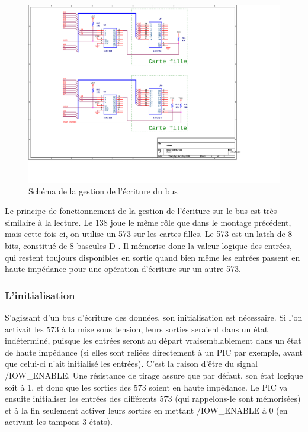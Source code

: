 \documentclass[a4paper]{article}
\begin{document}
\begin{figure}[H]
	\centering
	\includegraphics[scale=1.00]{Images/Montage_bus_ecriture}
	\caption{Schéma de la gestion de l'écriture du bus
		\label{Montage_bus_ecriture}}
\end{figure}

Le principe de fonctionnement de la gestion de l'écriture sur le bus est très similaire à la lecture. Le 138 \cite{74HC138} joue le même rôle que dans le montage précédent, mais cette fois ci, on utilise un 573 sur les cartes filles. Le 573 est un latch de 8 bits, constitué de 8 bascules D \cite{74HC573}. Il mémorise donc la valeur logique des entrées, qui restent toujours disponibles en sortie quand bien même les entrées passent en haute impédance pour une opération d'écriture sur un autre 573.

\subsubsection{L'initialisation}

S'agissant d'un bus d'écriture des données, son initialisation est nécessaire. Si l'on activait les 573 à la mise sous tension, leurs sorties seraient dans un état indéterminé, puisque les entrées seront au départ vraisemblablement dans un état de haute impédance (si elles sont reliées directement à un PIC par exemple, avant que celui-ci n'ait initialisé les entrées). C'est la raison d'être du signal /IOW\_ENABLE. Une résistance de tirage assure que par défaut, son état logique soit à 1, et donc que les sorties des 573 soient en haute impédance. Le PIC va ensuite initialiser les entrées des différents 573 (qui rappelons-le sont mémorisées) et à la fin seulement activer leurs sorties en mettant /IOW\_ENABLE à 0 (en activant les tampons 3 états).
\end{document}
